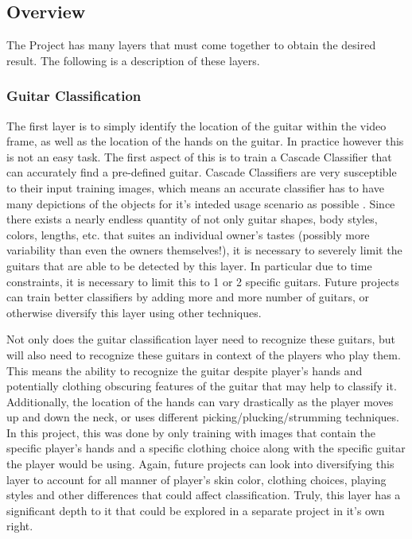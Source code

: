 \subsection{Overview}
The \project Project has many layers that must come together to obtain the desired result.
The following is a description of these layers.
\subsubsection{Guitar Classification}
The first layer is to simply identify the location of the guitar within the video frame,
as well as the location of the hands on the guitar.
In practice however this is not an easy task.
The first aspect of this is to train a Cascade Classifier that can accurately find a pre-defined guitar.
Cascade Classifiers are very susceptible to their input training images,
which means an accurate classifier has to have many depictions of the objects
for it's inteded usage scenario as possible \cite{opencv}\cite{codingrobin}.
Since there exists a nearly endless quantity of not only guitar shapes, body styles, colors, lengths, etc.
that suites an individual owner's tastes (possibly more variability than even the owners themselves!),
it is necessary to severely limit the guitars that are able to be detected by this layer.
In particular due to time constraints, it is necessary to limit this to 1 or 2 specific guitars.
Future projects can train better classifiers by adding more and more number of guitars,
or otherwise diversify this layer using other techniques.
\par
Not only does the guitar classification layer need to recognize these guitars,
but will also need to recognize these guitars in context of the players who play them.
This means the ability to recognize the guitar despite player's hands and potentially clothing obscuring
features of the guitar that may help to classify it.
Additionally, the location of the hands can vary drastically as the player moves up and down the neck,
or uses different picking/plucking/strumming techniques.
In this project, this was done by only training with images that contain the specific player's hands
and a specific clothing choice along with the specific guitar the player would be using.
Again, future projects can look into diversifying this layer to account for all manner of player's
skin color, clothing choices, playing styles and other differences that could affect classification.
Truly, this layer has a significant depth to it that could be explored in a separate project in it's own right.

